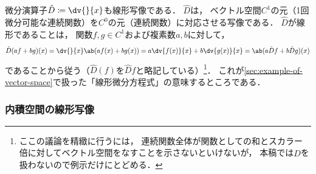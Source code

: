 \documentclass[
]{sotsu}
\begin{document}
微分演算子$\hat{D} \coloneq \dv{}{x}$も線形写像である．
$\hat{D}$は，
ベクトル空間$C^1$の元（1回微分可能な連続関数）を$C^0$の元（連続関数）に対応させる写像である．
$\hat{D}$が線形であることは，
関数$f, g \in C^1$および複素数$a, b$に対して，
\begin{equation*}
    \hat{D}(af + bg)(x) = \dv{}{x} \ab(a f(x) + b g(x))
        = a \dv{f(x)}{x} + b \dv{g(x)}{x}
        = \ab( a \hat{D}f + b \hat{D}g )(x)
\end{equation*}
であることから従う（$\hat{D}(f)$を$\hat{D}f$と略記している）\footnote{
    ここの議論を精緻に行うには，
    連続関数全体が関数としての和とスカラー倍に対してベクトル空間をなすことを示さないといけないが，
    本稿では$\hat{D}$を扱わないので例示だけにとどめる．
}．
これが\cref{sec:example-of-vector-space}で扱った「線形微分方程式」の意味するところである．



\subsubsection{内積空間の線形写像}
\end{document}
